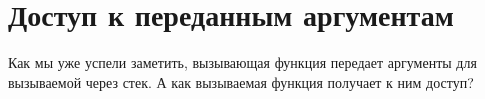 \chapter{Доступ к переданным аргументам}
\myindex{\Stack}

Как мы уже успели заметить, вызывающая функция передает аргументы для вызываемой через стек. 
А как вызываемая функция получает к ним доступ?









